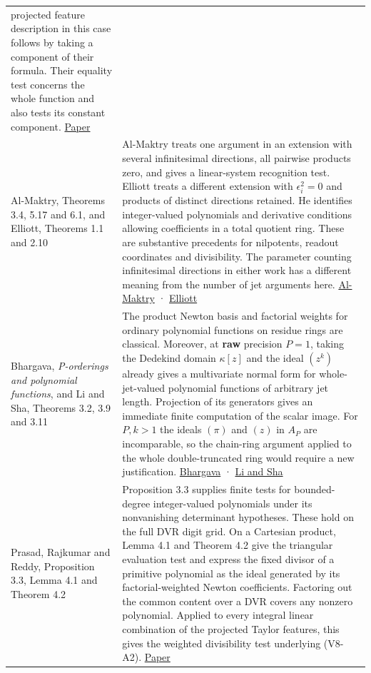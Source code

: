 \documentclass[
  11pt,
]{article}
\begin{document}
\begin{longtable}[]{@{}
  >{\raggedright\arraybackslash}p{}
  >{\raggedright\arraybackslash}p{}@{}}
projected feature description in this case follows by taking a component
of their formula. Their equality test concerns the whole function and
also tests its constant component.
\href{https://arxiv.org/pdf/1910.00238}{Paper} \\
Al-Maktry, Theorems 3.4, 5.17 and 6.1, and Elliott, Theorems 1.1 and
2.10 & Al-Maktry treats one argument in an extension with several
infinitesimal directions, all pairwise products zero, and gives a
linear-system recognition test. Elliott treats a different extension
with \(\epsilon_i^2=0\) and products of distinct directions retained. He
identifies integer-valued polynomials and derivative conditions allowing
coefficients in a total quotient ring. These are substantive precedents
for nilpotents, readout coordinates and divisibility. The parameter
counting infinitesimal directions in either work has a different meaning
from the number of jet arguments here.
\href{https://arxiv.org/pdf/2002.01304}{Al-Maktry} ·
\href{https://arxiv.org/pdf/1608.00171}{Elliott} \\
Bhargava, \emph{P-orderings and polynomial functions}, and Li and Sha,
Theorems 3.2, 3.9 and 3.11 & The product Newton basis and factorial
weights for ordinary polynomial functions on residue rings are
classical. Moreover, at \textbf{raw} precision \(P=1\), taking the
Dedekind domain \(\kappa[z]\) and the ideal \((z^k)\) already gives a
multivariate normal form for whole-jet-valued polynomial functions of
arbitrary jet length. Projection of its generators gives an immediate
finite computation of the scalar image. For \(P,k>1\) the ideals
\((\pi)\) and \((z)\) in \(A_P\) are incomparable, so the chain-ring
argument applied to the whole double-truncated ring would require a new
justification.
\href{https://doi.org/10.1515/crll.1997.490.101}{Bhargava} ·
\href{https://arxiv.org/pdf/1704.04965}{Li and Sha} \\
Prasad, Rajkumar and Reddy, Proposition 3.3, Lemma 4.1 and Theorem 4.2 &
Proposition 3.3 supplies finite tests for bounded-degree integer-valued
polynomials under its nonvanishing determinant hypotheses. These hold on
the full DVR digit grid. On a Cartesian product, Lemma 4.1 and Theorem
4.2 give the triangular evaluation test and express the fixed divisor of
a primitive polynomial as the ideal generated by its factorial-weighted
Newton coefficients. Factoring out the common content over a DVR covers
any nonzero polynomial. Applied to every integral linear combination of
the projected Taylor features, this gives the weighted divisibility test
underlying (V8-A2). \href{https://arxiv.org/pdf/1803.05780}{Paper} \\
\end{longtable}
\end{document}
